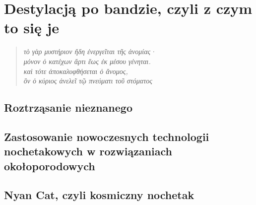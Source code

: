 \chapter{Destylacją po bandzie, czyli z czym to się je}

\begin{quote}
    \textit{\textgreek{τὸ γὰρ μυστήριον ἤδη ἐνεργεῖται τῆς ἀνομίας· \\ μόνον ὁ κατέχων ἄρτι ἕως ἐκ μέσου γένηται. \\ καὶ τότε ἀποκαλυφθήσεται ὁ ἄνομος, \\ ὃν ὁ κύριος ἀνελεῖ τῷ πνεύματι τοῦ στόματος}} 
\end{quote}

\section{Roztrząsanie nieznanego}

\section{Zastosowanie nowoczesnych technologii nochetakowych w rozwiązaniach okołoporodowych}



\section{Nyan Cat, czyli kosmiczny nochetak}
